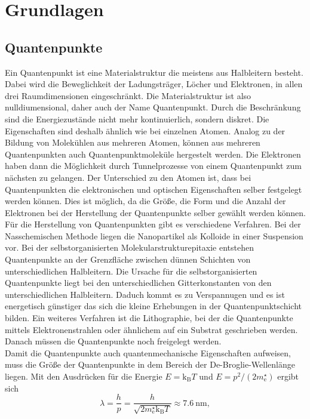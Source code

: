\section{Grundlagen}\label{sec:Grundlagen}
\subsection{Quantenpunkte}
Ein Quantenpunkt \cite{quantum_dot} ist eine Materialstruktur die meistens aus Halbleitern besteht. Dabei wird die Beweglichkeit der Ladungsträger, Löcher und Elektronen, in allen drei Raumdimensionen eingeschränkt. Die Materialstruktur ist also nulldiumensional, daher auch der Name Quantenpunkt.  Durch die Beschränkung sind die Energiezustände nicht mehr kontinuierlich, sondern diskret. Die Eigenschaften sind deshalb ähnlich wie bei einzelnen Atomen. Analog zu der Bildung von Molekühlen aus mehreren Atomen, können aus mehreren Quantenpunkten auch  Quantenpunktmoleküle hergestelt werden. Die Elektronen haben dann die Möglichkeit durch Tunnelprozesse von einem Quantenpunkt zum nächsten zu gelangen. Der Unterschied zu den Atomen ist, dass bei Quantenpunkten die elektronischen und optischen Eigenschaften selber festgelegt werden können. Dies ist möglich, da die Grö{\ss}e, die Form und die Anzahl der Elektronen bei der Herstellung der Quantenpunkte selber gewählt werden können. \\
Für die Herstellung von Quantenpunkten gibt es verschiedene Verfahren. Bei der Nasschemischen Methode liegen die Nanopartikel als Kolloide in einer Suspension vor. Bei der selbstorganisierten Molekularstrukturepitaxie entstehen Quantenpunkte an der Grenzfläche zwischen dünnen Schichten von unterschiedlichen Halbleitern. Die Ursache für die selbstorganisierten Quantenpunkte liegt bei den unterschiedlichen Gitterkonstanten von den unterschiedlichen Halbleitern. Daduch kommt es zu Verspannugen und es ist energetisch günstiger das sich die  kleine Erhebungen in der Quantenpunktschicht bilden. Ein weiteres Verfahren ist die Lithographie, bei der die Quantenpunkte mittels Elektronenstrahlen oder ähnlichem auf ein Substrat   \glqq geschrieben\grqq{} werden. Danach müssen die Quantenpunkte noch \glqq freigelegt\grqq{} werden. \\
Damit die Quantenpunkte auch quantenmechanische Eigenschaften aufweisen, muss die Grö{\ss}e der Quantenpunkte in dem Bereich der De-Broglie-Wellenlänge liegen.  Mit den Ausdrücken für die Energie $ E = \mathrm{k}_{\mathrm{B}} T$ und $ E = p^2/(2m_{\mathrm{e}}^\star)$ ergibt sich
\begin{equation}
\lambda = \frac{h}{p} = \frac{h}{\sqrt{2m_{\mathrm{e}}^\star \mathrm{k}_{\mathrm{B}} T}} \approx 7.6\ \mathrm{nm},
\end{equation}
